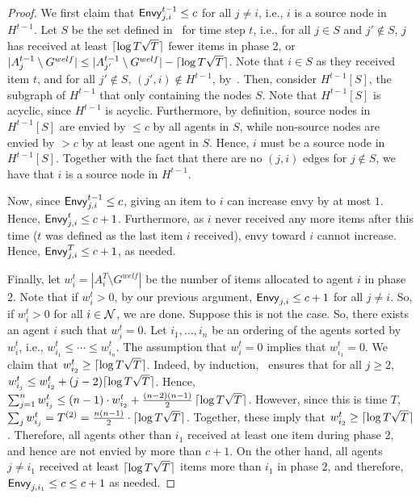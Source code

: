 \begin{proof}
    We first claim that $\mathsf{Envy}^{t - 1}_{j, i} \le c$ for all $j \ne i$, i.e., $i$ is a source node in $H^{t - 1}$. Let $S$ be the set defined in~ for time step $t$, i.e., for all $j \in S$ and $j' \notin S$, $j$ has received at least $\lceil\log T \sqrt{T}\rceil$ fewer items in phase 2, or  $|A^{t - 1}_j \setminus G^{welf}| \le |A^{t - 1}_{j'} \setminus G^{welf}| - \lceil\log T \sqrt{T}\rceil$. Note that $i \in S$ as they received item $t$, and for all $j' \notin S$, $(j', i) \notin H^{t - 1}$, by~. Then, consider $H^{t - 1}[S]$, the subgraph of $H^{t - 1}$ that only containing the nodes $S$. Note that $H^{t - 1}[S]$ is acyclic, since $H^{t - 1}$ is acyclic. Furthermore, by definition, source nodes in $H^{t - 1}[S]$ are envied by $\le c$ by all agents in $S$, while non-source nodes are envied by $>c$ by at least one agent in $S$. Hence, $i$ must be a source node in $H^{t - 1}[S]$. Together with the fact that there are no $(j, i)$ edges for $j \notin S$, we have that $i$ is a source node in $H^{t - 1}$.

    Now, since $\mathsf{Envy}^{t - 1}_{j, i} \le c$, giving an item to $i$ can increase envy by at most $1$. Hence, $\mathsf{Envy}^{t}_{j, i} \le c + 1$. Furthermore, as $i$ never received any more items after this time ($t$ was defined as the last item $i$ received), envy toward $i$ cannot increase. Hence, $\mathsf{Envy}^T_{j, i} \le c + 1$, as needed. 

    Finally, let $w^t_i = |A^T_i \setminus G^{welf}|$ be the number of items allocated to agent $i$ in phase $2$. Note that if $w^t_i > 0$, by our previous argument, $\mathsf{Envy}_{j, i} \le c + 1$ for all $j \ne i$. So, if $w^t_i > 0$ for all $i \in \mathcal{N}$, we are done. Suppose this is not the case. So, there exists an agent $i$ such that  $w^t_i = 0$. Let $i_1, \ldots, i_n$ be an ordering of the agents sorted by $w^t_i$, i.e., $w^t_{i_1} \le \cdots \le w^t_{i_n}$. The assumption that $w^t_i = 0$ implies that $w^t_{i_1} = 0$. We claim that $w^t_{i_2} \ge \lceil\log T \sqrt{T}\rceil$. Indeed, by induction,~ ensures that for all $j \ge 2$, $w^t_{i_j} \le w^t_{i_2} + (j - 2) \lceil\log T \sqrt{T}\rceil$. Hence, 
    $\sum_{j=1}^n w^t_{i_j} \le (n - 1) \cdot w^t_{i_2} + \frac{(n - 2)(n - 1)}{2} \, \lceil\log T \sqrt{T}\rceil$. 
    However, since this is time $T$,  $\sum_j w^t_{i_j} = T^{(2)} = \frac{n(n - 1)}{2} \cdot \lceil\log T \sqrt{T}\rceil$. Together, these imply that $w^t_{i_2} \geq \lceil\log T \sqrt{T}\rceil$. Therefore, all agents other than $i_1$ received at least one item during phase 2, and hence are not envied by more than $c + 1$. On the other hand, all agents $j \ne i_1$ received at least $\lceil\log T \sqrt{T}\rceil$ items more than $i_1$ in phase $2$, and therefore, $\mathsf{Envy}_{j, {i_1}} \le c \le c + 1$ as needed.
\end{proof}
